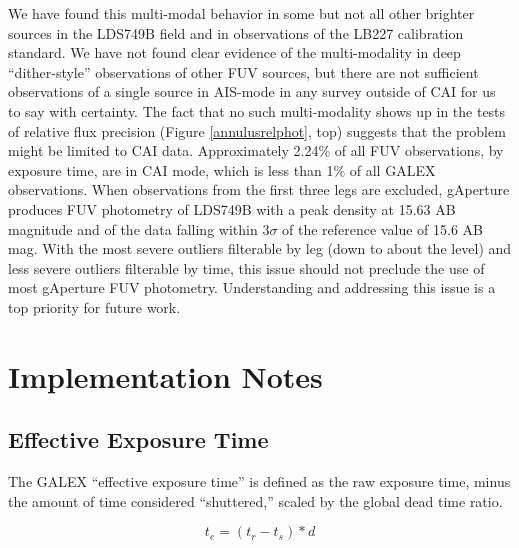 \documentclass[trackchanges,preprint2]{aastex}
\begin{document}
We have found this multi-modal behavior in some but not all other brighter sources in the LDS749B field and in observations of the LB227 calibration standard. We have not found clear evidence of the multi-modality in deep ``dither-style'' observations of other FUV sources, but there are not sufficient observations of a single source in AIS-mode in any survey outside of CAI for us to say with certainty. The fact that no such multi-modality shows up in the tests of relative flux precision (Figure \ref{annulusrelphot}, top) suggests that the problem might be limited to CAI data. Approximately 2.24\% of all FUV observations, by exposure time, are in CAI mode, which is less than 1\% of all GALEX observations. When observations from the first three legs are excluded, gAperture produces FUV photometry of LDS749B with a peak density at 15.63 AB magnitude and  of the data falling within 3$\sigma$ of the reference value of 15.6 AB mag. With the most severe outliers filterable by leg (down to about the  level) and less severe outliers filterable by time, this issue should not preclude the use of most gAperture FUV photometry.  Understanding and addressing this issue is a top priority for future work.

\section{Implementation Notes}
\label{implementation}

\subsection{Effective Exposure Time}
\label{effexptime}
The GALEX ``effective exposure time'' is defined as the raw exposure time, minus the amount of time considered ``shuttered,'' scaled by the global dead time ratio.

\[t_e=(t_r-t_s)*d\]
\end{document}
